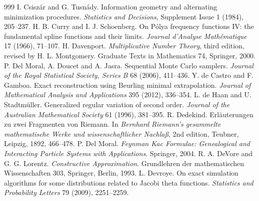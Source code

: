 \begin{thebibliography}{999}
 I. Csisz\'ar and G. Tusn\'ady. Information geometry and alternating minimization procedures. \emph{Statistics and Decisions}, Supplement Issue 1 (1984), 205--237.
 H. B. Curry and I. J. Schoenberg. On P\'olya frequency functions IV: the fundamental spline functions and their limits. \emph{Journal d'Analyse Math\'ematique} 17 (1966), 71--107.
 H. Davenport. \emph{Multiplicative Number Theory}, third edition, revised by H. L. Montgomery. Graduate Texts in Mathematics 74, Springer, 2000.
 P. Del Moral, A. Doucet and A. Jasra. Sequential Monte Carlo samplers. \emph{Journal of the Royal Statistical Society, Series B} 68 (2006), 411--436.
 Y. de Castro and F. Gamboa. Exact reconstruction using Beurling minimal extrapolation. \emph{Journal of Mathematical Analysis and Applications} 395 (2012), 336--354.
 L. de Haan and U. Stadtm\"uller. Generalized regular variation of second order. \emph{Journal of the Australian Mathematical Society} 61 (1996), 381--395.
 R. Dedekind. Erl\"auterungen zu zwei Fragmenten von Riemann. In \emph{Bernhard Riemann's gesammelte mathematische Werke und wissenschaftlicher Nachla{\ss}}, 2nd edition, Teubner, Leipzig, 1892, 466--478.
 P. Del Moral. \emph{Feynman Kac Formulae: Genealogical and Interacting Particle Systems with Applications}. Springer, 2004.
 R. A. DeVore and G. G. Lorentz. \emph{Constructive Approximation}. Grundlehren der mathematischen Wissenschaften 303, Springer, Berlin, 1993. %
 L. Devroye. On exact simulation algorithms for some distributions related to Jacobi theta functions. \emph{Statistics and Probability Letters} 79 (2009), 2251--2259.

\end{thebibliography}

